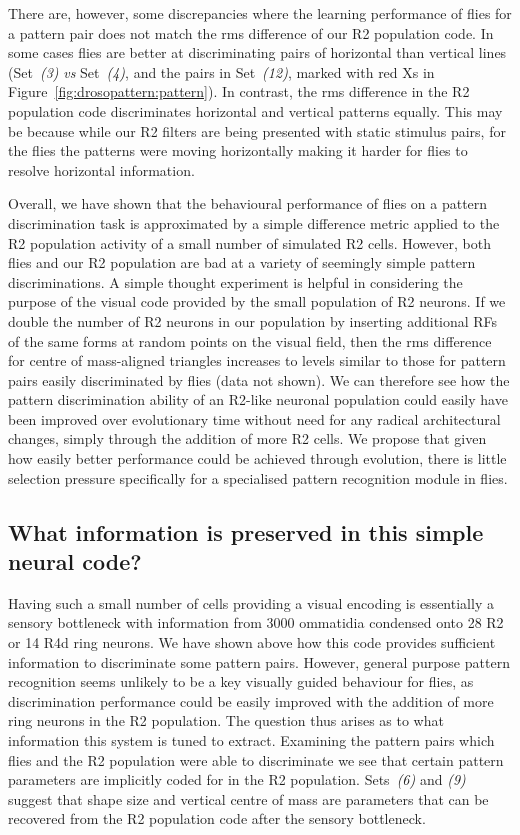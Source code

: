 There are, however, some discrepancies where the learning performance of flies for a pattern pair does not match the \ac{rms} difference of our R2 population code. In some cases flies are better at discriminating pairs of horizontal than vertical lines (Set~\emph{(3)} \emph{vs} Set~\emph{(4)}, and the pairs in Set~\emph{(12)}, marked with red Xs in Figure~\ref{fig:drosopattern:pattern}). In contrast, the \ac{rms} difference in the R2 population code discriminates horizontal and vertical patterns equally. This may be because while our R2 filters are being presented with static stimulus pairs, for the flies the patterns were moving horizontally \cite<as noted in>{Ernst1999} making it harder for flies to resolve horizontal information.

Overall, we have shown that the behavioural performance of flies on a pattern discrimination task is approximated by a simple difference metric applied to the R2 population activity of a small number of simulated R2 cells. However, both flies and our R2 population are bad at a variety of seemingly simple pattern discriminations. A simple thought experiment is helpful in considering the purpose of the visual code provided by the small population of R2 neurons. If we double the number of R2 neurons in our population by inserting additional RFs of the same forms at random points on the visual field, then the \ac{rms} difference for centre of mass-aligned triangles increases to levels similar to those for pattern pairs easily discriminated by flies (data not shown). We can therefore see how the pattern discrimination ability of an R2-like neuronal population could easily have been improved over evolutionary time without need for any radical architectural changes, simply through the addition of more R2 cells. We propose that given how easily better performance could be achieved through evolution, there is little selection pressure specifically for a specialised pattern recognition module in flies.

\subsection{What information is preserved in this simple neural code?}

Having such a small number of cells providing a visual encoding is essentially a sensory bottleneck with information from 3000 ommatidia condensed onto 28 R2 or 14 R4d ring neurons. We have shown above how this code provides sufficient information to discriminate some pattern pairs. However, general purpose pattern recognition seems unlikely to be a key visually guided behaviour for flies, as discrimination performance could be easily improved with the addition of more ring neurons in the R2 population. The question thus arises as to what information this system is tuned to extract. Examining the pattern pairs which flies and the R2 population were able to discriminate we see that certain pattern parameters are implicitly coded for in the R2 population. Sets~\emph{(6)} and \emph{(9)} suggest that shape size and vertical centre of mass are parameters that can be recovered from the R2 population code after the sensory bottleneck.

